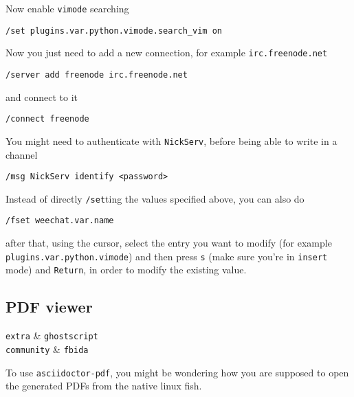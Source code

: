 \documentclass[10pt]{dustdoc}
\begin{document}
Now enable \texttt{vimode} searching

\begin{verbatim}
/set plugins.var.python.vimode.search_vim on
\end{verbatim}

Now you just need to add a new connection, for example \texttt{irc.freenode.net}

\begin{verbatim}
/server add freenode irc.freenode.net
\end{verbatim}

\noindent
and connect to it

\begin{verbatim}
/connect freenode
\end{verbatim}

\begin{NOTE}
    You might need to authenticate with \texttt{NickServ}, before being able to write in a channel

    \begin{verbatim}
/msg NickServ identify <password>
    \end{verbatim}
\end{NOTE}
\begin{NOTE}
    Instead of directly \texttt{/set}ting the values specified above, you can also do

    \begin{verbatim}
/fset weechat.var.name
    \end{verbatim}

    \noindent
    after that, using the cursor, select the entry you want to modify (for example \texttt{plugins.var.python.vimode}) and then press \texttt{s} (make sure you’re in \texttt{insert} mode) and \texttt{Return}, in order to modify the existing value.
\end{NOTE}

\subsection{PDF viewer}%
\label{sec:fish-pdf-viewer}

\begin{pkgtable}
    \texttt{extra} & \texttt{ghostscript} \\
    \texttt{community} & \texttt{fbida} \\
\end{pkgtable}

To use \texttt{asciidoctor-pdf}, you might be wondering how you are supposed to open the generated PDFs from the native linux fish.
\end{document}
